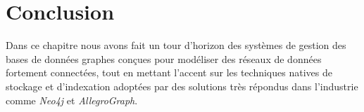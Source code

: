 \section*{Conclusion}
 

Dans ce chapitre nous avons fait un tour d'horizon des systèmes de
gestion des bases de données graphes conçues pour modéliser des
réseaux de données fortement connectées, tout en mettant l'accent sur
les techniques natives de stockage et d'indexation adoptées par des
solutions très répondus dans l'industrie comme \textit{Neo4j} et
\textit{AllegroGraph}.


